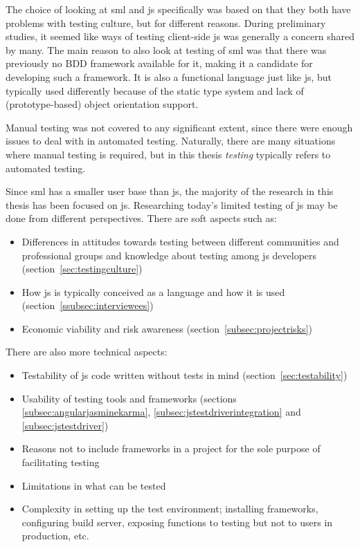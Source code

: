\documentclass[11pt]{article}
\begin{document}
The choice of looking at \gls{sml} and \gls{js} specifically was based on that they both have problems with testing culture, but for different reasons. During preliminary studies, it seemed like ways of testing client-side \gls{js} was generally a concern shared by many. The main reason to also look at testing of \gls{sml} was that there was previously no BDD framework available for it, making it a candidate for developing such a framework. It is also a functional language just like \gls{js}, but typically used differently because of the static type system and lack of (prototype-based) object orientation support.

Manual testing was not covered to any significant extent, since there were enough issues to deal with in automated testing. Naturally, there are many situations where manual testing is required, but in this thesis \emph{testing} typically refers to automated testing.

Since \gls{sml} has a smaller user base than \gls{js}, the majority of the research in this thesis has been focused on \gls{js}. Researching today's limited testing of \gls{js} may be done from different perspectives. There are soft aspects such as:
\begin{itemize}[label={--}]
\item Differences in attitudes towards testing between different communities and professional groups and knowledge about testing among \gls{js} developers (section~\ref{sec:testingculture})
\item How \gls{js} is typically conceived as a language and how it is used (section~\ref{ssubsec:interviewees})
\item Economic viability and risk awareness (section~\ref{subsec:projectrisks})
\end{itemize}

There are also more technical aspects:
\begin{itemize}[label={--}]
\item Testability of \gls{js} code written without tests in mind (section~\ref{sec:testability})
\item Usability of testing tools and frameworks (sections \ref{subsec:angularjasminekarma}, \ref{subsec:jstestdriverintegration} and \ref{subsec:jstestdriver})
\item Reasons not to include frameworks in a project for the sole purpose of facilitating testing
\item Limitations in what can be tested
\item Complexity in setting up the test environment; installing frameworks, configuring build server, exposing functions to testing but not to users in production, etc.
\end{itemize}
\end{document}
